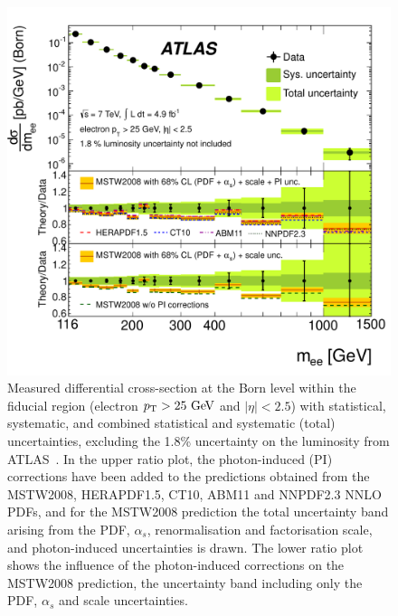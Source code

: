 \begin{figure}[p]
    \centering
    \includegraphics[height=0.3\textheight]{figures/ss-inclboson-drellyan-atlas7tev}
    \caption{Measured differential cross-section at the Born level within the
    fiducial region (electron $\pt > 25 \GeV$ and $|\eta| < 2.5$) with statistical,
     systematic, and combined statistical and systematic (total) uncertainties,
     excluding the 1.8\% uncertainty on the luminosity from ATLAS~\cite{Aad:2013iua}.
     In the upper ratio plot, the photon-induced (PI)
     corrections have been added to the predictions obtained from the MSTW2008,
     HERAPDF1.5, CT10, ABM11 and NNPDF2.3 NNLO PDFs, and for the MSTW2008 prediction
     the total uncertainty band arising from the PDF, $\alpha_s$, renormalisation
     and factorisation scale, and photon-induced uncertainties is drawn. The lower
     ratio plot shows the influence of the photon-induced corrections on the
     MSTW2008 prediction, the uncertainty band including only the PDF, $\alpha_s$
     and scale uncertainties.}
    \label{fig:ss-inclboson-drellyan-atlas7tev}
\end{figure}

